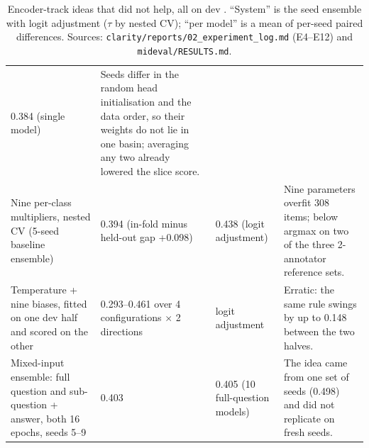 \begin{table}[t]
\begin{tabular}{@{}p{}p{}p{}p{}@{}}
\raggedright 0.384 (single model) &
\raggedright Seeds differ in the random head initialisation and the data order, so
their weights do not lie in one basin; averaging any two already lowered the slice
score. \tabularnewline
\raggedright Nine per-class multipliers, nested CV (5-seed baseline ensemble) &
\raggedright 0.394 (in-fold minus held-out gap +0.098) &
\raggedright 0.438 (logit adjustment) &
\raggedright Nine parameters overfit 308 items; below argmax on two of the three
2-annotator reference sets. \tabularnewline
\raggedright Temperature + nine biases, fitted on one dev half and scored on the other &
\raggedright 0.293--0.461 over 4 configurations $\times$ 2 directions &
\raggedright logit adjustment &
\raggedright Erratic: the same rule swings by up to 0.148 between the two halves.
\tabularnewline
\raggedright Mixed-input ensemble: full question and sub-question + answer, both 16 epochs, seeds 5--9 &
\raggedright 0.403 &
\raggedright 0.405 (10 full-question models) &
\raggedright The idea came from one set of seeds (0.498) and did not replicate on fresh
seeds. \tabularnewline
\bottomrule
\end{tabular}
\caption{Encoder-track ideas that did not help, all on dev \Stwo. ``System'' is the
seed ensemble with logit adjustment ($\tau$ by nested CV); ``per model'' is a mean of
per-seed paired differences. Sources: \texttt{clarity/reports/02\_experiment\_log.md}
(E4--E12) and \texttt{mideval/RESULTS.md}.}
\label{tab:app-negative}
\end{table}
